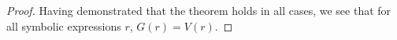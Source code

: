 \begin{proof}
    Having demonstrated that the theorem holds in all cases, we see that for all symbolic expressions $r$, $G(r) = V(r)$.
    
    \end{proof}